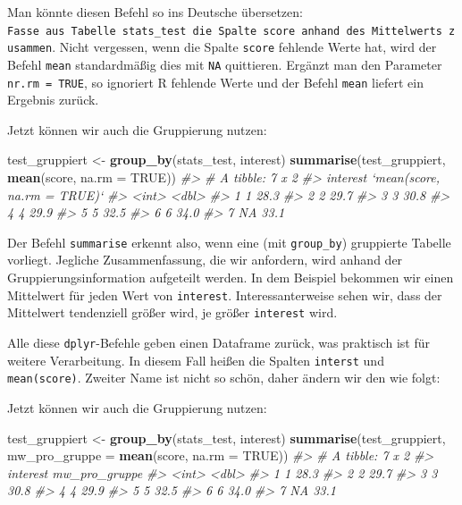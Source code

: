 \documentclass[12pt,ngerman,]{book}
\makeatletter
\newenvironment{Shaded}{\begin{snugshade}}{\end{snugshade}}
\newcommand{\KeywordTok}[1]{\textcolor[rgb]{0.13,0.29,0.53}{\textbf{#1}}}
\newcommand{\DataTypeTok}[1]{\textcolor[rgb]{0.13,0.29,0.53}{#1}}
\newcommand{\StringTok}[1]{\textcolor[rgb]{0.31,0.60,0.02}{#1}}
\newcommand{\CommentTok}[1]{\textcolor[rgb]{0.56,0.35,0.01}{\textit{#1}}}
\newcommand{\OtherTok}[1]{\textcolor[rgb]{0.56,0.35,0.01}{#1}}
\newcommand{\NormalTok}[1]{#1}
\newenvironment{kframe}{%
\medskip{}
\setlength{\fboxsep}{.8em}
 \def\at@end@of@kframe{}%
 \ifinner\ifhmode%
  \def\at@end@of@kframe{\end{minipage}}%
  \begin{minipage}{\columnwidth}%
 \fi\fi%
 \def\FrameCommand##1{\hskip\@totalleftmargin \hskip-\fboxsep
 \colorbox{shadecolor}{##1}\hskip-\fboxsep
     \hskip-\linewidth \hskip-\@totalleftmargin \hskip\columnwidth}%
 \MakeFramed {\advance\hsize-\width
   \@totalleftmargin\z@ \linewidth\hsize
   \@setminipage}}%
 {\par\unskip\endMakeFramed%
 \at@end@of@kframe}
\renewenvironment{Shaded}{\begin{kframe}}{\end{kframe}}
\theoremstyle{definition}
\theoremstyle{definition}
\theoremstyle{remark}
\makeatother
\begin{document}
Man könnte diesen Befehl so ins Deutsche übersetzen:
\texttt{Fasse\ aus\ Tabelle\ stats\_test\ die\ Spalte\ score\ anhand\ des\ Mittelwerts\ zusammen}.
Nicht vergessen, wenn die Spalte \texttt{score} fehlende Werte hat, wird
der Befehl \texttt{mean} standardmäßig dies mit \texttt{NA} quittieren.
Ergänzt man den Parameter \texttt{nr.rm\ =\ TRUE}, so ignoriert R
fehlende Werte und der Befehl \texttt{mean} liefert ein Ergebnis zurück.

Jetzt können wir auch die Gruppierung nutzen:

\begin{Shaded}
\begin{Highlighting}[]
\NormalTok{test_gruppiert <-}\StringTok{ }\KeywordTok{group_by}\NormalTok{(stats_test, interest)}
\KeywordTok{summarise}\NormalTok{(test_gruppiert, }\KeywordTok{mean}\NormalTok{(score, }\DataTypeTok{na.rm =} \OtherTok{TRUE}\NormalTok{))}
\CommentTok{#> # A tibble: 7 x 2}
\CommentTok{#>   interest `mean(score, na.rm = TRUE)`}
\CommentTok{#>      <int>                       <dbl>}
\CommentTok{#> 1        1                        28.3}
\CommentTok{#> 2        2                        29.7}
\CommentTok{#> 3        3                        30.8}
\CommentTok{#> 4        4                        29.9}
\CommentTok{#> 5        5                        32.5}
\CommentTok{#> 6        6                        34.0}
\CommentTok{#> 7       NA                        33.1}
\end{Highlighting}
\end{Shaded}

Der Befehl \texttt{summarise} erkennt also, wenn eine (mit
\texttt{group\_by}) gruppierte Tabelle vorliegt. Jegliche
Zusammenfassung, die wir anfordern, wird anhand der
Gruppierungsinformation aufgeteilt werden. In dem Beispiel bekommen wir
einen Mittelwert für jeden Wert von \texttt{interest}.
Interessanterweise sehen wir, dass der Mittelwert tendenziell größer
wird, je größer \texttt{interest} wird.

Alle diese \texttt{dplyr}-Befehle geben einen Dataframe zurück, was
praktisch ist für weitere Verarbeitung. In diesem Fall heißen die
Spalten \texttt{interst} und \texttt{mean(score)}. Zweiter Name ist
nicht so schön, daher ändern wir den wie folgt:

Jetzt können wir auch die Gruppierung nutzen:

\begin{Shaded}
\begin{Highlighting}[]
\NormalTok{test_gruppiert <-}\StringTok{ }\KeywordTok{group_by}\NormalTok{(stats_test, interest)}
\KeywordTok{summarise}\NormalTok{(test_gruppiert, }\DataTypeTok{mw_pro_gruppe =} \KeywordTok{mean}\NormalTok{(score, }\DataTypeTok{na.rm =} \OtherTok{TRUE}\NormalTok{))}
\CommentTok{#> # A tibble: 7 x 2}
\CommentTok{#>   interest mw_pro_gruppe}
\CommentTok{#>      <int>         <dbl>}
\CommentTok{#> 1        1          28.3}
\CommentTok{#> 2        2          29.7}
\CommentTok{#> 3        3          30.8}
\CommentTok{#> 4        4          29.9}
\CommentTok{#> 5        5          32.5}
\CommentTok{#> 6        6          34.0}
\CommentTok{#> 7       NA          33.1}
\end{Highlighting}
\end{Shaded}
\end{document}

